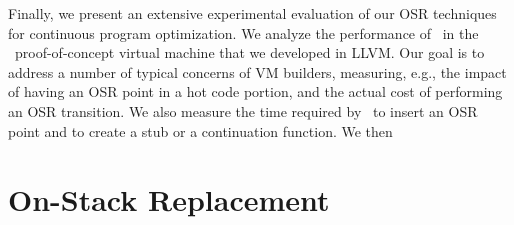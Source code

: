 Finally, we present an extensive experimental evaluation of our OSR techniques for continuous program optimization. We analyze the performance of \osrkit\ in the \tinyvm\ proof-of-concept virtual machine that we developed in LLVM. Our goal is to address a number of typical concerns of VM builders, measuring, e.g., the impact of having an OSR point in a hot code portion, and the actual cost of performing an OSR transition. We also measure the time required by \osrkit\ to insert an OSR point and to create a stub or a continuation function. We then \missing

\ifdefined \noauthorea


\fi

\section{On-Stack Replacement}